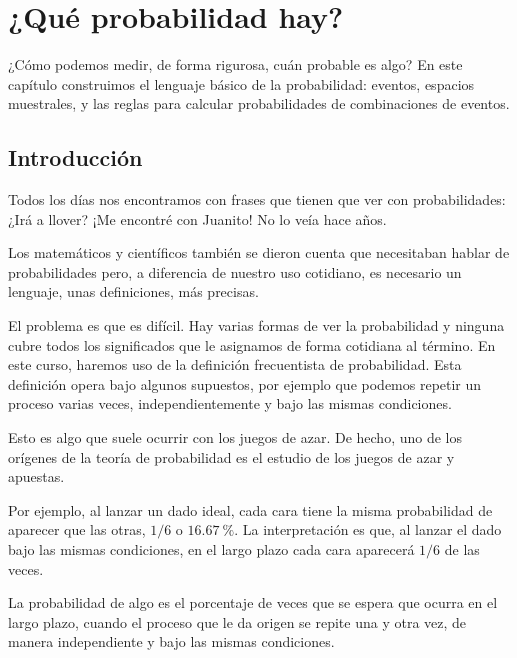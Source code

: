 \chapter{¿Qué probabilidad hay?}

\begin{ideanote}
¿Cómo podemos medir, de forma rigurosa, cuán probable es algo? En este capítulo construimos el lenguaje básico de la probabilidad: eventos, espacios muestrales, y las reglas para calcular probabilidades de combinaciones de eventos.
\end{ideanote}

\section{Introducción}

Todos los días nos encontramos con frases que tienen que ver con probabilidades: ¿Irá a llover? ¡Me encontré con Juanito! No lo veía hace años.

Los matemáticos y científicos también se dieron cuenta que necesitaban hablar de probabilidades pero, a diferencia de nuestro uso cotidiano, es necesario un lenguaje, unas definiciones, más precisas.

El problema es que es difícil. Hay varias formas de ver la probabilidad y ninguna cubre todos los significados que le asignamos de forma cotidiana al término. En este curso, haremos uso de la definición frecuentista de probabilidad. Esta definición opera bajo algunos supuestos, por ejemplo que podemos repetir un proceso varias veces, independientemente y bajo las mismas condiciones.

Esto es algo que suele ocurrir con los juegos de azar. De hecho, uno de los orígenes de la teoría de probabilidad es el estudio de los juegos de azar y apuestas.

Por ejemplo, al lanzar un dado ideal, cada cara tiene la misma probabilidad de aparecer que las otras, \(1/6\) o \(\qty{16.67}{\percent}\). La interpretación es que, al lanzar el dado bajo las mismas condiciones, en el largo plazo cada cara aparecerá \(1/6\) de las veces.

\begin{definition}
La probabilidad de algo es el porcentaje de veces que se espera que ocurra en el largo plazo, cuando el proceso que le da origen se repite una y otra vez, de manera independiente y bajo las mismas condiciones.
\end{definition}

